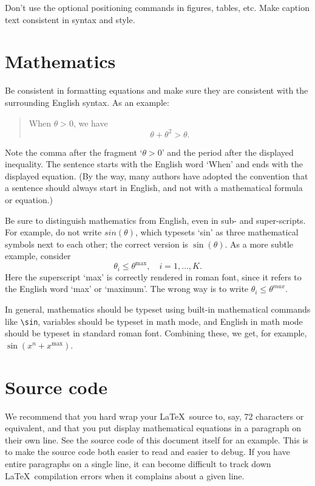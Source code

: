\documentclass[openany]{now} %
\begin{document}
Don't use the optional positioning commands in figures, tables, etc.
Make caption text consistent in syntax and style.

\section{Mathematics}
Be consistent in formatting equations and make sure they are consistent 
with the surrounding English syntax.
As an example: 
\begin{quote}
When $\theta >0$, we have
\[
\theta + \theta^2 > \theta.
\]
\end{quote}
Note the comma after the fragment `$\theta>0$' and the period after the displayed
inequality. The sentence starts with the English word `When' and ends with 
the displayed equation.
(By the way, many authors have adopted the convention that a 
sentence should always start in English, and not with a mathematical 
formula or equation.)

Be sure to distinguish mathematics from English, even in sub- and super-scripts.
For example, do not write $sin(\theta)$, which typesets `sin' as
three mathematical symbols next to each other; the correct version is $\sin(\theta)$.
As a more subtle example, consider 
\[
\theta_i \leq \theta^\mathrm{max}, \quad i=1, \ldots, K.
\]
Here the superscript `max' is correctly rendered in roman font, since it refers
to the English word `max' or `maximum'.  The wrong way is to write $\theta_i
\leq \theta^{max}$. 

In general, mathematics should be typeset using built-in mathematical commands like
\texttt{\textbackslash sin}, variables should be typeset in math mode, and
English in math mode should be typeset in standard roman font.  Combining
these, we get, for example, $\sin(x^n + x^\mathrm{max})$.

\section{Source code}
\label{s-formatting-source}

We recommend that you hard wrap your \LaTeX\ source to, say, 72 characters or
equivalent, and that you put display mathematical equations in a paragraph on their
own line. See the source code of this document itself for an example.
This is to make the source code both easier to read and easier to debug. 
If you have entire paragraphs on a single line, it can become difficult
to track down \LaTeX\ compilation errors when it complains about a given line.
\end{document}
